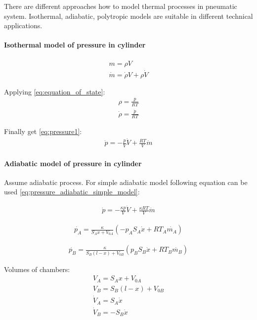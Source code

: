 There are different approaches how to model thermal processes in pneumatic
system. Isothermal, adiabatic, polytropic models are suitable in different
technical applications. 


\paragraph{Isothermal model of pressure in cylinder}

\begin{align}
    m = \rho V \\
    \dot{m} = \dot{\rho} V + \rho \dot{V}
\end{align}

Applying \ref{eq:equation_of_state}:
\begin{align}
    \rho = \frac{p}{RT} \\
    \dot{\rho} = \frac{\dot{p}}{RT} 
\end{align}

Finally get \ref{eq:pressure1}:
\begin{align}
    \dot{p} = - \frac{p}{V}\dot{V} + \frac{RT}{V}\dot{m}
    \label{eq:pressure1}
\end{align}


\paragraph{Adiabatic model of pressure in cylinder} 
Assume adiabatic process.
For simple adiabatic model following equation can be used
\ref{eq:pressure_adiabatic_simple_model}:

\begin{align}
    \dot{p} = - \frac{\kappa p}{V}\dot{V} + \frac{\kappa RT}{V}\dot{m}
    \label{eq:pressure_adiabatic_simple_model}
\end{align}

\begin{align}
    \dot{p_A} = \frac{\kappa}{S_A x + V_{0A}} \left(- p_A S_A\dot{x} + RT_A\dot{m_A}
    \right)
\end{align}

\begin{align}
    \dot{p_B} = \frac{\kappa}{S_B (l-x) + V_{0B}} \left(p_B S_B\dot{x} + RT_B\dot{m_B}
    \right)
\end{align}

Volumes of chambers:
\begin{align}
    V_A = S_A x + V_{0A} \\
    V_B = S_B (l-x) + V_{0B} \\
    \dot{V}_A = S_A \dot{x} \\
    \dot{V}_B = - S_B \dot{x}
\end{align}

